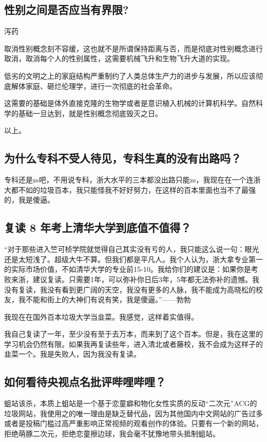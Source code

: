 \documentclass{ctexart}
\begin{document}
	\subsection{性别之间是否应当有界限?}
	
	泻药
	
	取消性别概念刻不容缓，这也就不是所谓保持距离与否，而是彻底对性别概念进行取消，取消每个人的性别属性，这需要机械飞升和生物飞升大道的实现。
	
	低劣的文明之上的家庭结构严重制约了人类总体生产力的进步与发展，所以应该彻底解体家庭、砸烂伦理学，进行一次彻底的社会革命。
	
	这需要的基础是体外直接克隆的生物学或者是意识植入机械的计算机科学。自然科学的基础一旦达到，就是性别概念彻底毁灭之日。
	
	以上。
	
	\subsection{为什么专科不受人待见，专科生真的没有出路吗？}
	
	专科还是zs吧，不用说专科，浙大水平的三本都没出路只能zs，我现在在一个连浙大都不如的垃圾百本，我只能怪我不好好努力，在这样的百本里面也当不了最强的，我是傻逼。
	
	\subsection{复读 8 年考上清华大学到底值不值得？}
	
	“对于那些进入竺可桢学院就觉得自己其实没有亏的人，我只能这么说一句：眼光还是太短浅了。超级大牛不算。但我们都是平凡人。我个人认为，浙大拿专业第一的实际市场价值，不如清华大学的专业前15-10。我给你们的建议是：如果你是考败来浙，建议复读。只需要1年，可以弥补你日后3年，5年都无法弥补的遗憾。我没有复读，我没有看到更广阔的天空，我没有更多的人脉，我不能成为高晓松的校友，我不能和街上的大神们有说有笑，我是傻逼。”——勃勃
	
	我现在在国外百本垃圾大学当韭菜。我感觉，这样着实值得。
	
	我自己复读了一年，至少没有至于去万本，而来到了这个百本。但是，我在这里的学习机会仍然有限。如果我再复读些年，进入清北或者藤校，我不会成为这样子的韭菜一个。我是失败人，因为我没有复读。
	
	\subsection{如何看待央视点名批评哔哩哔哩？}
	
	蛆站该杀，本质上蛆站是一个基于恋童癖和物化女性实质的反动“二次元”ACG的垃圾网站，我使用之的唯一理由是缺乏替代品，因为其他国内中文网站的广告过多或者是投稿门槛过高严重影响正常视频的观看创作的体验。只要有一个新的网站，拒绝萌豚二次元，拒绝恋童擦边球，我会毫不犹豫地带头抵制蛆站。
	
\end{document}

